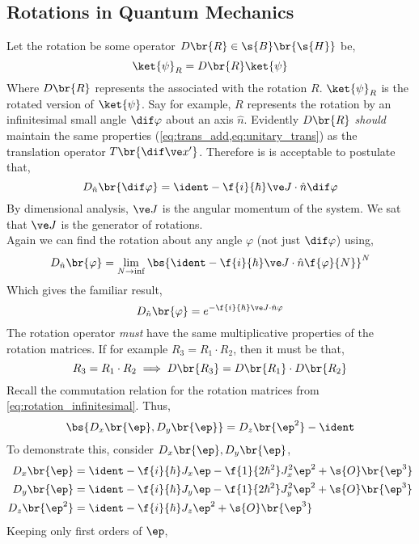 \documentclass{article}
\begin{document}
\subsection{Rotations in Quantum Mechanics}
Let the rotation be some operator $D\br{R} \in \s{B}\br{\s{H}}$ be,
\[ \ket{\psi}_{R} = D\br{R} \ket{\psi} \]
Where $D\br{R}$ represents the  associated with the rotation $R$. $\ket{\psi}_R$ is the rotated version of $\ket{\psi}$. Say for example, $R$ represents the rotation by an infinitesimal small angle $\dif \varphi$ about an axis $\hat{n}$. Evidently $D\br{R}$ \textit{should} maintain the same properties (\cref{eq:trans_add,eq:unitary_trans}) as the translation operator $T\br{\dif \ve x'}$. Therefore is is acceptable to postulate that,
\[ D_{\hat n}\br{\dif \varphi} = \ident - \f{i}{\hbar} \ve J \cdot \hat n \dif \varphi \]
By dimensional analysis, $\ve J$ is the angular momentum of the system. We sat that $\ve J$ is the generator of rotations. \\
Again we can find the rotation about any angle $\varphi$ (not just $\dif \varphi$) using,
\[D_{\hat n}\br{\varphi} = \lim_{N \to \inf} \bs{\ident - \f{i}{\hbar} \ve J \cdot \hat n \f{\varphi}{N}}^N \]
Which gives the familiar result,
\[D_{\hat n}\br{\varphi} = e^{-\f{i}{\hbar} \ve J \cdot \hat n \varphi} \]
The rotation operator \textit{must} have the same multiplicative properties of the rotation matrices. If for example $R_3 = R_1 \cdot R_2$, then it must be that,
\[ R_3 = R_1 \cdot R_2 \implies D\br{R_3} = D\br{R_1} \cdot D\br{R_2} \]
Recall the commutation relation for the rotation matrices from \cref{eq:rotation_infinitesimal}. Thus,
\[ \bs{D_x\br{\ep}, D_y\br{\ep}} = D_z\br{\ep^2} - \ident \]
To demonstrate this, consider $D_x\br{\ep}, D_y\br{\ep}$,
\begin{align*}
    D_x\br{\ep} &= \ident - \f{i}{\hbar}  J_x \ep - \f{1}{2\hbar^2}J_x^2\ep^2 + \s{O}\br{\ep^3} \\
    D_y\br{\ep} &= \ident - \f{i}{\hbar}  J_y \ep - \f{1}{2\hbar^2}J_y^2\ep^2 + \s{O}\br{\ep^3} \\
    D_z\br{\ep^2} &= \ident - \f{i}{\hbar}  J_z \ep^2 + \s{O}\br{\ep^3} \\
\end{align*}
Keeping only first orders of $\ep$,
\end{document}
